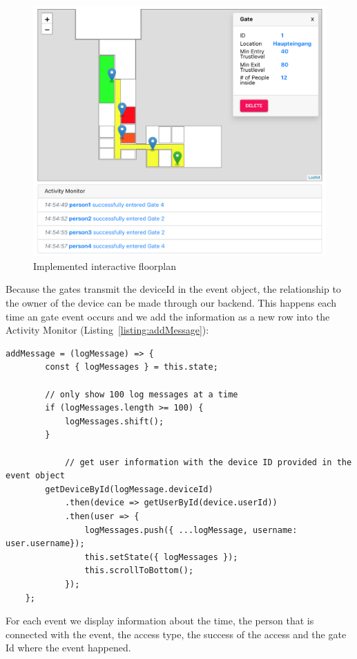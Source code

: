 \begin{figure}[!hb]
	\centering
	\includegraphics[width=0.9\linewidth]{images/FloorplanScreenshot}
	\caption{Implemented interactive floorplan}
	\label{fig:FloorplanScreenshot}
\end{figure}

Because the gates transmit the deviceId in the event object, the relationship to the owner of the device can be made through our backend. This happens each time an gate event occurs and we add the information as a new row into the Activity Monitor (Listing~\ref{listing:addMessage}):

\begin{lstlisting}[label={listing:addMessage},caption={Function for adding message to Activity Monitor}]
addMessage = (logMessage) => {
        const { logMessages } = this.state;
        
        // only show 100 log messages at a time
        if (logMessages.length >= 100) {
            logMessages.shift();
        }

			// get user information with the device ID provided in the event object
        getDeviceById(logMessage.deviceId)
            .then(device => getUserById(device.userId))
            .then(user => {
                logMessages.push({ ...logMessage, username: user.username});
                this.setState({ logMessages });
                this.scrollToBottom();
            });
    };
\end{lstlisting}

For each event we display information about the time, the person that is connected with the event, the access type, the success of the access and the gate Id where the event happened.

